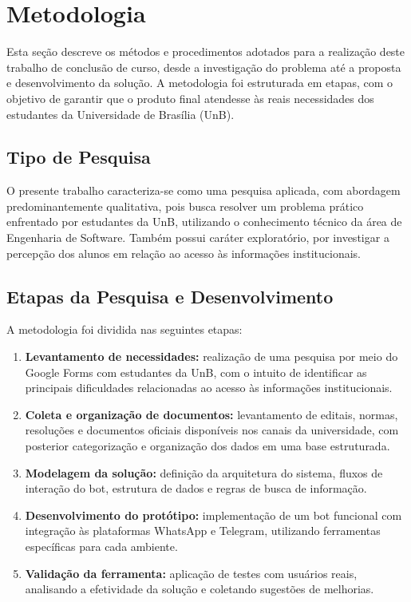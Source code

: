 \chapter[Metodologia]{Metodologia}

Esta seção descreve os métodos e procedimentos adotados para a realização deste trabalho de conclusão de curso, desde a investigação do problema até a proposta e desenvolvimento da solução. A metodologia foi estruturada em etapas, com o objetivo de garantir que o produto final atendesse às reais necessidades dos estudantes da Universidade de Brasília (UnB).

\section{Tipo de Pesquisa}

O presente trabalho caracteriza-se como uma pesquisa aplicada, com abordagem predominantemente qualitativa, pois busca resolver um problema prático enfrentado por estudantes da UnB, utilizando o conhecimento técnico da área de Engenharia de Software. Também possui caráter exploratório, por investigar a percepção dos alunos em relação ao acesso às informações institucionais.

\section{Etapas da Pesquisa e Desenvolvimento}

A metodologia foi dividida nas seguintes etapas:

\begin{enumerate}
    \item \textbf{Levantamento de necessidades:} realização de uma pesquisa por meio do Google Forms com estudantes da UnB, com o intuito de identificar as principais dificuldades relacionadas ao acesso às informações institucionais.
    
    \item \textbf{Coleta e organização de documentos:} levantamento de editais, normas, resoluções e documentos oficiais disponíveis nos canais da universidade, com posterior categorização e organização dos dados em uma base estruturada.
    
    \item \textbf{Modelagem da solução:} definição da arquitetura do sistema, fluxos de interação do bot, estrutura de dados e regras de busca de informação.
    
    \item \textbf{Desenvolvimento do protótipo:} implementação de um bot funcional com integração às plataformas WhatsApp e Telegram, utilizando ferramentas específicas para cada ambiente.
    
    \item \textbf{Validação da ferramenta:} aplicação de testes com usuários reais, analisando a efetividade da solução e coletando sugestões de melhorias.
\end{enumerate}

